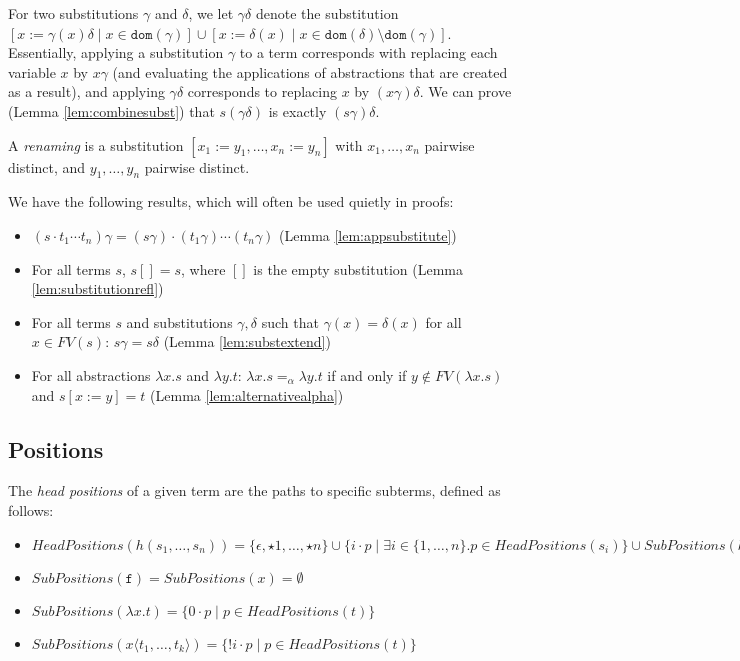 \documentclass{lmcs}
\theoremstyle{theorem}\newtheorem{theorem}{Theorem}
\theoremstyle{theorem}\newtheorem{lemma}[theorem]{Lemma}
\theoremstyle{theorem}\newtheorem{corollary}[theorem]{Corollary}
\theoremstyle{definition}\newtheorem{definition}[theorem]{Definition}
\theoremstyle{definition}\newtheorem{example}[theorem]{Example}
\newcommand{\FV}{\mathit{FV}}
\newcommand{\SubPositions}{\mathit{SubPositions}}
\newcommand{\HeadPositions}{\mathit{HeadPositions}}
\newcommand{\domain}{\mathtt{dom}}
\newcommand{\identifier}[1]{\mathtt{#1}}
\newcommand{\afun}{\identifier{f}}
\newcommand{\avar}{x}
\newcommand{\bvar}{y}
\newcommand{\abs}[2]{\lambda #1.#2}
\newcommand{\meta}[2]{#1\langle#2\rangle}
\begin{document}
For two substitutions $\gamma$ and $\delta$, we let $\gamma\delta$ denote the substitution
$[\avar := \gamma(\avar)\delta \mid \avar \in \domain(\gamma)] \cup
[\avar := \delta(\avar) \mid \avar \in \domain(\delta) \setminus \domain(\gamma)]$.
Essentially, applying a substitution $\gamma$ to a term corresponds with replacing each variable
$\avar$ by $\avar\gamma$ (and evaluating the applications of abstractions that are created as a
result), and applying $\gamma\delta$ corresponds to replacing $\avar$ by $(\avar\gamma)\delta$.
We can prove (Lemma \ref{lem:combinesubst}) that $s(\gamma\delta)$ is exactly $(s\gamma)\delta$.

A \emph{renaming} is a substitution $[x_1:=y_1,\dots,x_n:=y_n]$ with $x_1,\dots,x_n$ pairwise
distinct, and $y_1,\dots,y_n$ pairwise distinct.

We have the following results, which will often be used quietly in proofs:
\begin{itemize}
\item $(s \cdot t_1 \cdots t_n)\gamma = (s\gamma) \cdot (t_1\gamma) \cdots (t_n\gamma)$
  (Lemma \ref{lem:appsubstitute})
\item For all terms $s$, $s[] = s$, where $[]$ is the empty substitution
  (Lemma \ref{lem:substitutionrefl})
\item For all terms $s$ and substitutions $\gamma,\delta$ such that $\gamma(\avar) = \delta(\avar)$
  for all $\avar \in \FV(s)$: $s\gamma = s\delta$ (Lemma \ref{lem:substextend})
\item For all abstractions $\abs{\avar}{s}$ and $\abs{\bvar}{t}$:
  $\abs{\avar}{s} =_\alpha \abs{\bvar}{t}$ if and only if $\bvar \notin \FV(\abs{\avar}{s})$ and
  $s[\avar:=\bvar] = t$ (Lemma \ref{lem:alternativealpha})
\end{itemize}

\subsection{Positions}

The \emph{head positions} of a given term are the paths to specific subterms, defined as follows:

\begin{itemize}
\item $\HeadPositions(h(s_1,\dots,s_n)) = \{ \epsilon, \star 1, \dots, \star n \} \cup
  \{ i \cdot p \mid \exists i \in \{1,\dots,n\}. p \in \HeadPositions(s_i) \} \cup
  \SubPositions(h)$
\item $\SubPositions(\afun) = \SubPositions(\avar) = \emptyset$
\item $\SubPositions(\abs{\avar}{t}) = \{ 0 \cdot p \mid p \in \HeadPositions(t) \}$
\item $\SubPositions(\meta{\avar}{t_1,\dots,t_k}) = \{ !i \cdot p \mid p \in
  \HeadPositions(t) \}$
\end{itemize}
\end{document}
